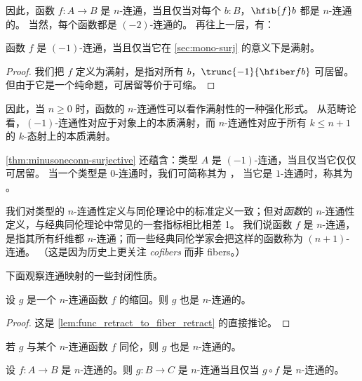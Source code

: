 因此，函数 $f:A\to B$ 是 $n$-连通，当且仅当对每个 $b:B$，$\hfib{f}b$ 都是 $n$-连通的。
当然，每个函数都是 $(-2)$-连通的。
再往上一层，有：

\begin{lem}\label{thm:minusoneconn-surjective}
  函数 $f$ 是 $(-1)$-连通，当且仅当它在 \cref{sec:mono-surj} 的意义下是满射。
\end{lem}
\begin{proof}
  我们把 $f$ 定义为满射，是指对所有 $b$，$\trunc{-1}{\hfiber f b}$ 可居留。
  但由于它是一个纯命题，可居留等价于可缩。
\end{proof}

因此，当 $n\ge 0$ 时，函数的 $n$-连通性可以看作满射性的一种强化形式。
从范畴论看，$(-1)$-连通性对应于对象上的本质满射，而 $n$-连通性对应于所有 $k\le n+1$ 的 $k$-态射上的本质满射。

\cref{thm:minusoneconn-surjective} 还蕴含：类型 $A$ 是 $(-1)$-连通，当且仅当它仅仅可居留。
当一个类型是 $0$-连通时，我们可简称其为 ，
%
%
当它是 $1$-连通时，称其为 。
%
%

\begin{rmk}\label{rmk:connectedness-indexing}
  我们对类型的 $n$-连通性定义与同伦理论中的标准定义一致；但对\emph{函数}的 $n$-连通性定义，与经典同伦理论中常见的一套指标相比相差 1。
  我们说函数 $f$ 是 $n$-连通，是指其所有纤维都 $n$-连通；而一些经典同伦学家会把这样的函数称为 $(n+1)$-连通。
  （这是因为历史上更关注 \emph{cofibers} 而非 fibers。）
\end{rmk}

下面观察连通映射的一些封闭性质。

\begin{lem}
%
设 $g$ 是一个 $n$-连通函数 $f$ 的缩回。则 $g$ 也是
$n$-连通的。
\end{lem}
\begin{proof}
这是 \cref{lem:func_retract_to_fiber_retract} 的直接推论。
\end{proof}

\begin{cor}
若 $g$ 与某个 $n$-连通函数 $f$ 同伦，则 $g$ 也是 $n$-连通的。
\end{cor}

\begin{lem}\label{lem:nconnected_postcomp}
设 $f:A\to B$ 是 $n$-连通的。则 $g:B\to C$ 是 $n$-连通当且仅当 $g\circ f$ 是
$n$-连通的。
\end{lem}

